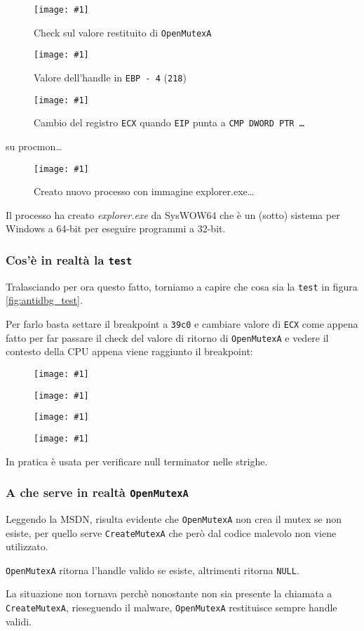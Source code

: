 \documentclass[
    a4paper, %
    11pt %
]{article}
\newcommand{\pic}[4]{\begin{figure}[H]
            \centering
            \texttt{[image: \#1]}
            \caption{#2}
            \label{fig:#1}
            \end{figure}}
\begin{document}
            \pic{openmutexa_check}{Check sul valore restituito di \texttt{OpenMutexA}} {10cm}{1.5cm}
            \pic{openmutexa_handle}{Valore dell'handle in \texttt{EBP - 4} (\texttt{218})} {4cm}{1.5cm}
            \pic{openmutexa_ecx}{Cambio del registro \texttt{ECX} quando \texttt{EIP} punta a \texttt{CMP 
            DWORD PTR \dots}}{7cm}{1.75cm}

            su procmon\dots
            \pic{openmutexa_postcheck}{Creato nuovo processo con immagine explorer.exe\dots}{18cm}{2.5cm}

            Il processo ha creato \textit{explorer.exe} da SysWOW64 che è un (sotto) sistema per Windows
            a 64-bit per eseguire programmi a 32-bit.

            \subsubsection{Cos'è in realtà la \texttt{test}}
            Tralasciando per ora questo fatto, torniamo a capire che cosa sia la \texttt{test} in figura
            \ref{fig:antidbg_test}.

            Per farlo basta settare il breakpoint a \texttt{39c0} e cambiare valore di \texttt{ECX} come appena fatto per far passare il
            check del valore di ritorno di \texttt{OpenMutexA} e vedere il contesto della CPU appena viene
            raggiunto il breakpoint:

            \pic{test_brkp}{}{8cm}{1cm}
            \pic{test_brkp_ecx}{}{6cm}{1cm}
            \pic{test_brkp_ecx_1}{}{4cm}{1cm}
            \pic{test_brkp_ecx_2}{}{3cm}{1cm}

            In pratica è usata per verificare null terminator nelle strighe.

            \subsubsection{A che serve in realtà \texttt{OpenMutexA}} \label{sect:oma}

            Leggendo la MSDN, risulta evidente che \texttt{OpenMutexA} non crea il mutex se non esiste,
            per quello serve \texttt{CreateMutexA} che però dal codice malevolo non viene utilizzato.
            
            \texttt{OpenMutexA} ritorna l'handle valido se esiste, altrimenti ritorna \texttt{NULL}.
            
            La situazione non tornava perchè nonostante non sia presente la chiamata a 
            \texttt{CreateMutexA}, rieseguendo il malware, \texttt{OpenMutexA} restituisce sempre handle
            validi. 
            
\end{document}
